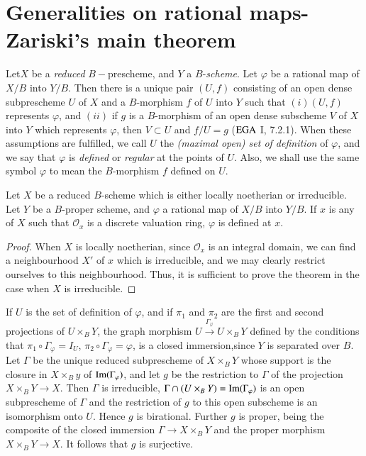 
\chapter{Generalities on rational maps-Zariski's main
  theorem}\label{chap3}%


Let\pageoriginale $X$ be a \textit{reduced} $B-$prescheme, and $Y$ a 
$B$-\textit{scheme}. Let $\varphi$ be a rational map of $X/B$ into
$Y/B$. Then there is a unique pair $(U,f)$ consisting of an open dense
subprescheme $U$ of $X$ and a $B$-morphism $f$ of $U$ into $Y$ such
that $(i) (U, f)$ represents $\varphi$, and $(ii)$ if $g$ is a
$B$-morphism of an open dense subscheme $V$ of $X$ into $Y$ which
represents $\varphi$, then $V \subset U$ and $f/U = g$ ($\operatorname{EGA}$   I,
7.2.1). When these assumptions are fulfilled, we call $U$ the
\textit{(maximal open)  set of definition} of $\varphi$, and we say
that $\varphi$ is \textit{defined} or \textit{regular} at the points
of $U$. Also, we shall use the same symbol $\varphi$ to mean
the $B$-morphism $f$ defined on $U$.  

Let $X$ be a reduced $B$-scheme which is either locally noetherian or
irreducible. Let $Y$ be a $B$-proper scheme, and $\varphi$ a rational
map of $X/B$ into $Y/B$. If $x$ is any of $X$ such that
$\mathscr{O}_x$ is a discrete valuation ring, $\varphi$ is defined at
$x$. 

\begin{proof}
  When $X$ is locally noetherian, since $\mathscr{O}_x$ is an integral
  domain, we can find a neighbourhood $X'$ of $x$ which is
  irreducible, and we may clearly restrict ourselves to this
  neighbourhood. Thus, it is sufficient to prove the theorem in the
  case when $X$ is irreducible. 
\end{proof}

If $U$ is the set of definition of $\varphi$, and if $\pi_1$ and
$\pi_2$ are the first and second projections of $U \times_B Y$, the graph
morphism $U \xrightarrow{\Gamma_\varphi} U \times_B Y$ defined by the
conditions that $\pi_1\circ\Gamma_\varphi = I_U$, $\pi_2\circ\Gamma_\varphi
= \varphi$, is a closed immersion,\pageoriginale  since $Y$ is separated
over $B$. Let $\Gamma$ be the unique reduced subprescheme of $X \times_B Y$
whose support is the closure in $X \times_B y$ of $\operatorname{Im} (\Gamma_\varphi)$,
and let $g$ be the restriction to $\Gamma$ of the projection $X \times_B Y
\rightarrow X$. Then $\Gamma$ is irreducible, $\Gamma \cap(U \times_B Y) = \operatorname{Im}
(\Gamma_\varphi)$ is an open subprescheme of $\Gamma$ and the
restriction of $g$ to this open subscheme is an isomorphism onto
$U$. Hence $g$ is birational. Further $g$ is proper, being the
composite of the closed immersion $\Gamma \rightarrow X \times_B Y$ and the
proper morphism $X \times_B Y \rightarrow X$. It follows that $g$ is
surjective. 

